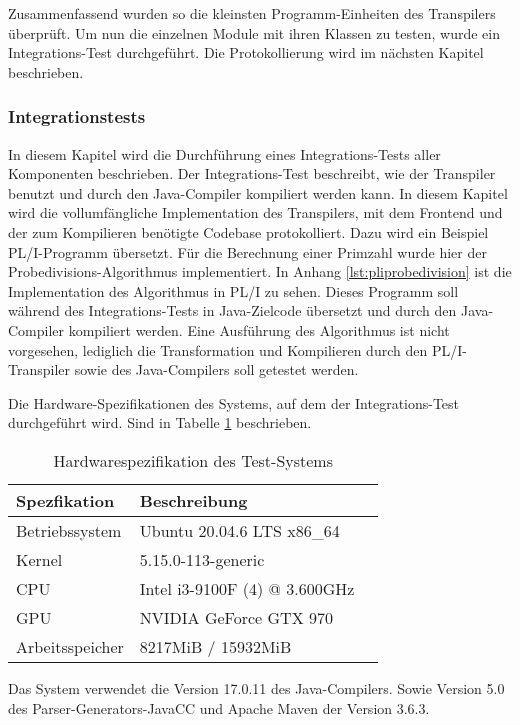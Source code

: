 Zusammenfassend wurden so die kleinsten Programm-Einheiten des Transpilers überprüft. Um nun die einzelnen Module mit ihren Klassen zu testen, wurde ein Integrations-Test durchgeführt. Die Protokollierung wird im nächsten Kapitel beschrieben.

\pagebreak
\subsubsection{Integrationstests}
In diesem Kapitel wird die Durchführung eines Integrations-Tests aller Komponenten beschrieben. Der Integrations-Test beschreibt, wie der Transpiler benutzt und durch den Java-Compiler kompiliert werden kann.
In diesem Kapitel wird die vollumfängliche Implementation des Transpilers, mit dem Frontend und der zum Kompilieren benötigte Codebase protokolliert. Dazu wird ein Beispiel PL/I-Programm übersetzt. Für die Berechnung einer Primzahl wurde hier der Probedivisions-Algorithmus implementiert. In Anhang \ref{lst:pliprobedivision} ist die Implementation des Algorithmus in PL/I zu sehen. Dieses Programm soll während des Integrations-Tests in Java-Zielcode übersetzt und durch den Java-Compiler kompiliert werden.
Eine Ausführung des Algorithmus ist nicht vorgesehen, lediglich die Transformation und Kompilieren durch den PL/I-Transpiler sowie des Java-Compilers
soll getestet werden.

Die Hardware-Spezifikationen des Systems, auf dem der Integrations-Test durchgeführt wird. Sind in Tabelle \ref{tab:hardwartable} beschrieben.

\begin{table}[h]\label{tab:hardwartable}
	\centering
	\begin{tabular}[h]{|l|l|l|}
		\hline
		\textbf{Spezfikation} & \textbf{Beschreibung}  \\
		\hline
		Betriebssystem & Ubuntu 20.04.6 LTS x86_64 \\
		\hline
		Kernel & 5.15.0-113-generic  \\
		\hline
		CPU & Intel i3-9100F (4) @ 3.600GHz \\
		\hline
		GPU & NVIDIA GeForce GTX 970  \\
		\hline
		Arbeitsspeicher & 8217MiB / 15932MiB \\
		\hline
		
	\end{tabular}
	\caption{Hardwarespezifikation des Test-Systems}
\end{table}

Das System verwendet die Version 17.0.11 des Java-Compilers. Sowie Version 5.0 des Parser-Generators-JavaCC und Apache Maven der Version 3.6.3.

